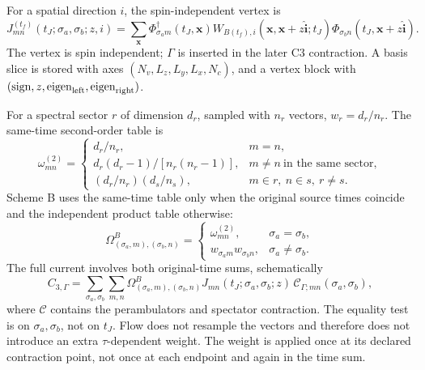 \documentclass[11pt]{article}
\numberwithin{equation}{section}
\begin{document}
For a spatial direction \(i\), the spin-independent vertex is
\begin{equation}
 J^{(t_f)}_{mn}(t_J;\sigma_a,\sigma_b;z,i)
 =\sum_{\boldsymbol{x}}
 \Phi^\dagger_{\sigma_a m}(t_J,\boldsymbol{x})
 W_{B(t_f),i}(\boldsymbol{x},\boldsymbol{x}+z\hat{\boldsymbol i};t_J)
 \Phi_{\sigma_b n}(t_J,\boldsymbol{x}+z\hat{\boldsymbol i}).
\label{eq:l32x64-vertex}
\end{equation}
The vertex is spin independent; \(\Gamma\) is inserted in the later C3
contraction.  A basis slice is stored with axes
\((N_v,L_z,L_y,L_x,N_c)\), and a vertex block with
\((\text{sign},z,\text{eigen}_{\rm left},\text{eigen}_{\rm right})\).

For a spectral sector \(r\) of dimension \(d_r\), sampled with \(n_r\)
vectors, \(w_r=d_r/n_r\).  The same-time second-order table is
\begin{equation}
 \omega^{(2)}_{mn}=
 \begin{cases}
 d_r/n_r,&m=n,\\
 d_r(d_r-1)/[n_r(n_r-1)],&
       m\ne n\ \text{in the same sector},\\
 (d_r/n_r)(d_s/n_s),&m\in r,\ n\in s,\ r\ne s.
 \end{cases}
\label{eq:l32x64-omega-second}
\end{equation}
Scheme B uses the same-time table only when the original source times
coincide and the independent product table otherwise:
\begin{equation}
 \Omega^B_{(\sigma_a,m),(\sigma_b,n)}
 =\begin{cases}
 \omega^{(2)}_{mn},&\sigma_a=\sigma_b,\\
 w_{\sigma_a m}w_{\sigma_b n},&\sigma_a\ne\sigma_b.
 \end{cases}
\label{eq:l32x64-omega-B}
\end{equation}
The full current involves both original-time sums, schematically
\begin{equation}
 C_{3,\Gamma}
 =\sum_{\sigma_a,\sigma_b}\sum_{m,n}
 \Omega^B_{(\sigma_a,m),(\sigma_b,n)}
 J_{mn}(t_J;\sigma_a,\sigma_b;z)\,
 \mathcal C_{\Gamma;mn}(\sigma_a,\sigma_b),
\label{eq:l32x64-double-time-sum}
\end{equation}
where \(\mathcal C\) contains the perambulators and spectator contraction.
The equality test is on \(\sigma_a,\sigma_b\), not on \(t_J\).  Flow does
not resample the vectors and therefore does not introduce an extra
\(\tau\)-dependent weight.  The weight is applied once at its declared
contraction point, not once at each endpoint and again in the time sum.
\end{document}
